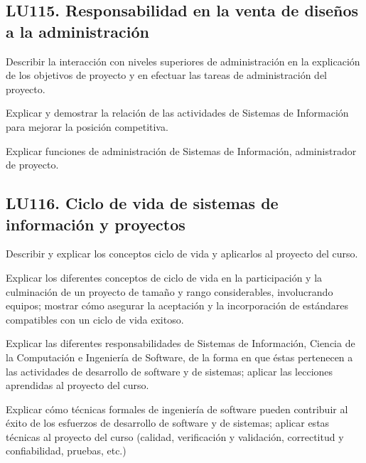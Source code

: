 \subsection{LU115. Responsabilidad en la venta de diseños a la administración}\label{sec:BOK-LU115}\label{sec:LU115}
\begin{LearningUnit}
\begin{LUGoal}
\item Describir la interacción con niveles superiores de administración en la explicación de los objetivos de proyecto y en efectuar las tareas de administración del proyecto.
\end{LUGoal}

\begin{LUObjective}
\item Explicar y demostrar la relación de las actividades de Sistemas de Información para mejorar la posición competitiva.
\item Explicar funciones de administración de Sistemas de Información, administrador de proyecto.
\end{LUObjective}
\end{LearningUnit}

\subsection{LU116. Ciclo de vida de sistemas de información y proyectos}\label{sec:BOK-LU116}\label{sec:LU116}
\begin{LearningUnit}
\begin{LUGoal}
\item Describir y explicar los conceptos ciclo de vida y aplicarlos al proyecto del curso.
\end{LUGoal}

\begin{LUObjective}
\item Explicar los diferentes conceptos de ciclo de vida en la participación y la culminación de un proyecto de tamaño y rango considerables, involucrando equipos; mostrar cómo asegurar la aceptación y la incorporación de estándares compatibles con un ciclo de vida exitoso.
\item Explicar las diferentes responsabilidades de Sistemas de Información, Ciencia de la Computación e Ingeniería de Software, de la forma en que éstas pertenecen a las actividades de desarrollo de software y de sistemas; aplicar las lecciones aprendidas al proyecto del curso.
\item Explicar cómo técnicas formales de ingeniería de software pueden contribuir al éxito de los esfuerzos de desarrollo de software y de sistemas; aplicar estas técnicas al proyecto del curso (calidad, verificación y validación, correctitud y confiabilidad, pruebas, etc.)
\end{LUObjective}
\end{LearningUnit}

